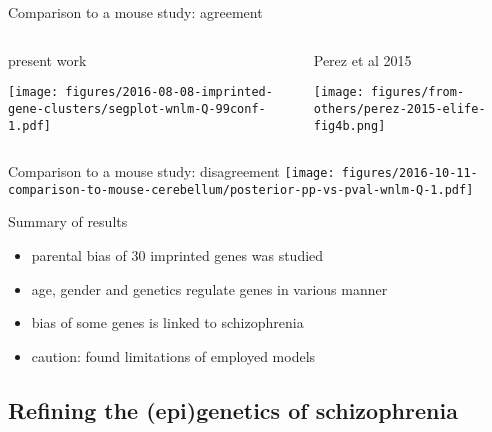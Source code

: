 \documentclass{beamer}
\newcommand{\ownfigscale}[0]{0.4}
\begin{document}
\begin{frame}{Comparison to a mouse study: agreement}
\begin{columns}[t]
\begin{column}{0.5\textwidth}
\begin{center}
present work

\texttt{[image: figures/2016-08-08-imprinted-gene-clusters/segplot-wnlm-Q-99conf-1.pdf]}

\end{center}
\end{column}

\begin{column}{0.5\textwidth}
\begin{center}
Perez et al 2015

\texttt{[image: figures/from-others/perez-2015-elife-fig4b.png]}
\end{center}
\end{column}
\end{columns}
\end{frame}

\begin{frame}{Comparison to a mouse study: disagreement}
\texttt{[image: figures/2016-10-11-comparison-to-mouse-cerebellum/posterior-pp-vs-pval-wnlm-Q-1.pdf]}
\end{frame}

\begin{frame}{Summary of results}
\begin{itemize}
\item parental bias of 30 imprinted genes was studied
\item age, gender and genetics regulate genes in various manner
\item bias of some genes is linked to schizophrenia 
\item caution: found limitations of employed models
\end{itemize}
\end{frame}





\subsection{Refining the (epi)genetics of schizophrenia}
\end{document}
